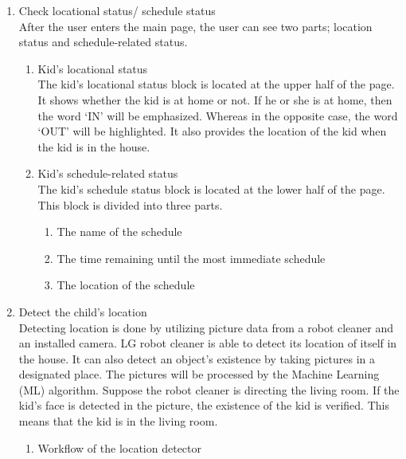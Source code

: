 \documentclass[conference]{IEEEtran}
\begin{document}
\begin{enumerate}[label=\arabic*.]
    \item {\large{Check locational status/ schedule status}} \\
    After the user enters the main page, the user can see two parts; location status and schedule-related status. \\
    \begin{enumerate}[label=\alph*.]
        \item Kid's locational status \\
        The kid’s locational status block is located at the upper half of the page. It shows whether the kid is at home or not. If he or she is at home, then the word ‘IN’ will be emphasized. Whereas in the opposite case, the word ‘OUT’ will be highlighted. It also provides the location of the kid when the kid is in the house. \\
        \item Kid’s schedule-related status \\
        The kid’s schedule status block is located at the lower half of the page. This block is divided into three parts. \\    
        \begin{enumerate}[label=\roman*.]
            \item The name of the schedule
            \item The time remaining until the most immediate schedule
            \item The location of the schedule \\
        \end{enumerate}      
    \end{enumerate}    
    \item {\large{Detect the child’s location}} \\        
    Detecting location is done by utilizing picture data from a robot cleaner and an installed camera. LG robot cleaner is able to detect its location of itself in the house. It can also detect an object’s existence by taking pictures in a designated place. The pictures will be processed by the Machine Learning (ML) algorithm. Suppose the robot cleaner is directing the living room. If the kid’s face is detected in the picture, the existence of the kid is verified. This means that the kid is in the living room. \\
    \begin{enumerate}[label=\alph*.]
        \item Workflow of the location detector \\

\end{enumerate}
\end{enumerate}
\end{document}
